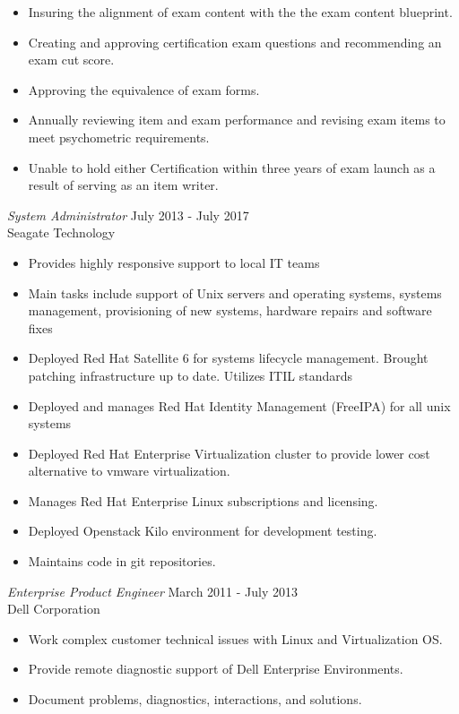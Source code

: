 \documentclass[margin]{res}
\begin{document}
\begin{resume}
\begin{itemize}
    \item Insuring the alignment of exam content with the the exam content blueprint.
    \item Creating and approving certification exam questions and recommending an exam cut score.
    \item Approving the equivalence of exam forms.
    \item Annually reviewing item and exam performance and revising exam items to meet psychometric requirements.
    \item Unable to hold either Certification within three years of exam launch as a result of serving as an item writer.
    \end{itemize}
	{\sl System Administrator} \hfill July 2013 - July 2017 \\
	Seagate Technology
	\begin{itemize}  \itemsep -2pt %
	\item Provides highly responsive support to local IT teams
	\item Main tasks include support of Unix servers and operating systems, systems management, provisioning of new systems, hardware repairs and software fixes
	\item Deployed Red Hat Satellite 6 for systems lifecycle management. Brought patching infrastructure up to date. Utilizes ITIL standards
	\item Deployed and manages Red Hat Identity Management (FreeIPA) for all unix systems
	\item Deployed Red Hat Enterprise Virtualization cluster to provide lower cost alternative to vmware virtualization.
	\item Manages Red Hat Enterprise Linux subscriptions and licensing.
	\item Deployed Openstack Kilo environment for development testing.
	\item Maintains code in git repositories.
	\end{itemize}
 	{\sl Enterprise Product Engineer} \hfill March 2011 - July 2013 \\
 	Dell Corporation
 	\begin{itemize}  \itemsep -2pt %
 		\item Work complex customer technical issues with Linux and Virtualization OS.
 		\item Provide remote diagnostic support of Dell Enterprise Environments.
 		\item Document problems, diagnostics, interactions, and solutions.

\end{itemize}
\end{resume}
\end{document}
